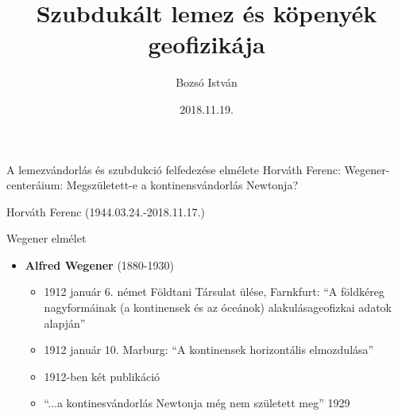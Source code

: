 \documentclass{beamer}
\title[Szubdukált lemez geofizikája]{Szubdukált lemez és köpenyék geofizikája}
\author{Bozsó István}
\institute[MTA CSFK GGI]{MTA CSFK Geodéziai és Geofzikai Intézet}
\date{2018.11.19.}
\begin{document}
\begin{frame}
    \titlepage
\end{frame}


\begin{frame}{A lemezvándorlás és szubdukció felfedezése elmélete}
    Horváth Ferenc: Wegener-centeráium: Megszületett-e a kontinensvándorlás Newtonja? \cite{horvath}
    \vspace{10pt}
    
    \pause
    
    \begin{center}
    \begin{minipage}[c]{0.625\textwidth}
        \centering
        
        Horváth Ferenc (1944.03.24.-2018.11.17.)
    \end{minipage}
    \end{center}
\end{frame}


\begin{frame}{Wegener elmélet}
    \begin{itemize}
        \item \textbf{Alfred Wegener} (1880-1930)
        \begin{itemize}
            \item 1912 január 6. német Földtani Társulat ülése, Farnkfurt: ``A földkéreg nagyformáinak (a kontinensek és az óceánok) alakulásageofizkai adatok alapján''
            \item 1912 január 10. Marburg: ``A kontinensek horizontális elmozdulása''
            \item 1912-ben két publikáció
            \item ``...a kontinesvándorlás Newtonja még nem született meg'' 1929
        \end{itemize}
    \end{itemize}
\end{frame}
\end{document}
